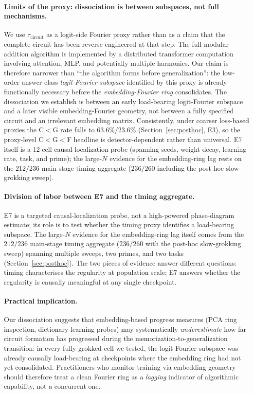 \documentclass{article}
\newcommand{\taucirc}{\tau_{\mathrm{circuit}}}
\begin{document}
\paragraph{Limits of the proxy: dissociation is between subspaces, not full mechanisms.}
We use $\taucirc$ as a logit-side Fourier proxy rather than as a
claim that the complete circuit has been reverse-engineered at that
step. The full modular-addition algorithm is implemented by a
distributed transformer computation involving attention, MLP, and
potentially multiple harmonics. Our claim is therefore narrower
than ``the algorithm forms before generalization'': the low-order
answer-class \emph{logit-Fourier subspace} identified by this proxy
is already functionally necessary before the
\emph{embedding-Fourier ring} consolidates. The dissociation we
establish is between an early load-bearing logit-Fourier subspace
and a later visible embedding-Fourier geometry, not between a fully
specified circuit and an irrelevant embedding matrix.
Consistently, under coarser loss-based proxies the C$<$G rate falls
to $63.6\%$/$23.6\%$ (Section~\ref{sec:posthoc}, E3), so the
proxy-level C$<$G$<$F headline is detector-dependent rather than
universal. E7 itself is a 12-cell causal-localization probe
(spanning seeds, weight decay, learning rate, task, and prime);
the large-$N$ evidence for the embedding-ring lag rests on the
$212/236$ main-stage timing aggregate ($236/260$ including the
post-hoc slow-grokking sweep).

\paragraph{Division of labor between E7 and the timing aggregate.}
E7 is a targeted causal-localization probe, not a high-powered
phase-diagram estimate; its role is to test whether the timing
proxy identifies a load-bearing subspace. The large-$N$ evidence
for the embedding-ring lag itself comes from the $212/236$
main-stage timing aggregate ($236/260$ with the post-hoc
slow-grokking sweep) spanning multiple
sweeps, two primes, and two tasks (Section~\ref{sec:posthoc}).
The two pieces of evidence answer different questions: timing
characterises the regularity at population scale; E7 answers
whether the regularity is causally meaningful at any single
checkpoint.

\paragraph{Practical implication.}
Our dissociation suggests that embedding-based progress measures
(PCA ring inspection, dictionary-learning probes) may systematically
\emph{underestimate} how far circuit formation has progressed during
the memorization-to-generalization transition: in every fully grokked
cell we tested, the logit-Fourier subspace was already causally
load-bearing at checkpoints where the embedding ring had not yet
consolidated. Practitioners who monitor training via embedding
geometry should therefore treat a clean Fourier ring as a
\emph{lagging} indicator of algorithmic capability, not a concurrent
one.
\end{document}
